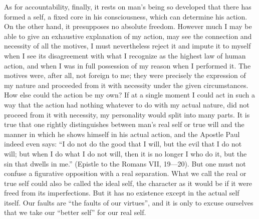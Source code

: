 \documentclass[12pt,a4paper,openany]{book}
\newcommand{\opage}[1]{\marginnote{\footnotesize\textit{[#1]}}}
\begin{document}
As for accountability, finally, it rests on man's being so developed that
there has formed a self, a fixed core in his consciousness, which can
determine his action. On the other hand, it presupposes no absolute freedom.
However \opage{125}much I may be able to give an exhaustive explanation of my
action, may see the connection and necessity of all the motives, I must
nevertheless reject it and impute it to myself when I see its disagreement
with what I recognize as the highest law of human action, and when I was in
full possession of my reason when I performed it. The motives were, after all,
not foreign to me; they were precisely the expression of my nature and
proceeded from it with necessity under the given circumstances. How else could
the action be my own? If at a single moment I could act in such a way that the
action had nothing whatever to do with my actual nature, did not proceed from
it with necessity, my personality would split into many parts. It is true that
one rightly distinguishes between man's real self or true will and the manner
in which he shows himself in his actual action, and the Apostle Paul indeed
even says: ``I do not do the good that I will, but the evil that I do not
will; but when I do what I do not will, then it is no longer I who do it, but
the sin that dwells in me.'' (Epistle to the Romans VII, 19---20). But one
must not confuse a figurative opposition with a real separation. What we call
the real or true self could also be called the ideal self, the character as it
would be if it were freed from its imperfections. But it has no existence
except in the actual self itself. Our faults are ``the faults of our
virtues'', and it is \opage{126}only to excuse ourselves that we take our
``better self'' for our real self.
\end{document}
